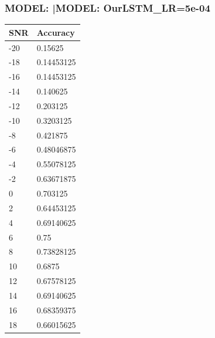 \documentclass[12pt,a4paper]{article}
\begin{document}
    \subsubsection{MODEL: |MODEL: OurLSTM_LR=5e-04}
    \begin{table}[!ht]
    \raggedright
    \begin{tabular}{|l|l|}
    \hline
        SNR & Accuracy \\ \hline
        -20 & 0.15625 \\ \hline
        -18 & 0.14453125 \\ \hline
        -16 & 0.14453125 \\ \hline
        -14 & 0.140625 \\ \hline
        -12 & 0.203125 \\ \hline
        -10 & 0.3203125 \\ \hline
        -8 & 0.421875 \\ \hline
        -6 & 0.48046875 \\ \hline
        -4 & 0.55078125 \\ \hline
        -2 & 0.63671875 \\ \hline
        0 & 0.703125 \\ \hline
        2 & 0.64453125 \\ \hline
        4 & 0.69140625 \\ \hline
        6 & 0.75 \\ \hline
        8 & 0.73828125 \\ \hline
        10 & 0.6875 \\ \hline
        12 & 0.67578125 \\ \hline
        14 & 0.69140625 \\ \hline
        16 & 0.68359375 \\ \hline
        18 & 0.66015625 \\ \hline
    \end{tabular}
\end{table}
    \newpage
    
\end{document}
